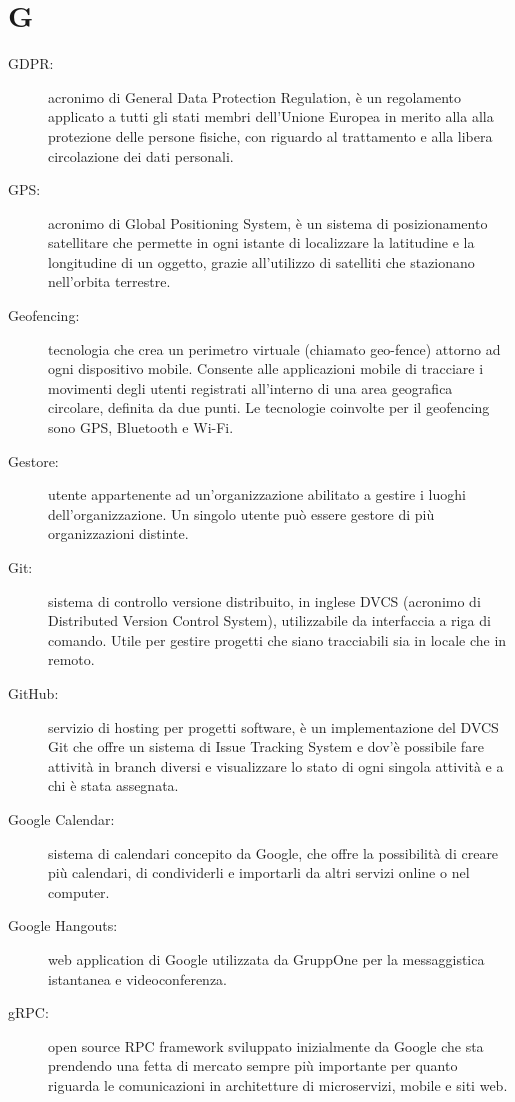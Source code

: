\documentclass{article}
\begin{document}
	\section{G}
	\begin{description}
		\item[GDPR:] acronimo di General Data Protection Regulation, è un regolamento applicato a tutti gli stati membri dell'Unione Europea in merito alla alla protezione delle persone fisiche, con riguardo al trattamento e alla libera circolazione dei dati personali.
		\item[GPS:] acronimo di Global Positioning System, è un sistema di posizionamento satellitare che permette in ogni istante di localizzare la latitudine e la longitudine di un oggetto, grazie all'utilizzo di satelliti che stazionano nell'orbita terrestre.
		\item[Geofencing:] tecnologia che crea un perimetro virtuale (chiamato geo-fence) attorno ad ogni dispositivo mobile. Consente alle applicazioni mobile di tracciare i movimenti degli utenti registrati all’interno di una area geografica circolare, definita da due punti. Le tecnologie coinvolte per il geofencing sono GPS, Bluetooth e Wi-Fi.
		\item[Gestore:] utente appartenente ad un'organizzazione abilitato a gestire i luoghi dell'organizzazione. Un singolo utente può essere gestore di più organizzazioni distinte.
		\item[Git:] sistema di controllo versione distribuito, in inglese DVCS (acronimo di Distributed Version Control System), utilizzabile da interfaccia a riga di comando. Utile per gestire progetti che siano tracciabili sia in locale che in remoto.
		\item[GitHub:] servizio di hosting per progetti software, è un implementazione del DVCS Git che offre un sistema di Issue Tracking System e dov'è possibile fare attività in branch diversi e visualizzare lo stato di ogni singola attività e a chi è stata assegnata.
		\item[Google Calendar:] sistema di calendari concepito da Google, che offre la possibilità di creare più calendari, di condividerli e importarli da altri servizi online o nel computer.
		\item[Google Hangouts:] web application di Google utilizzata da GruppOne per la messaggistica istantanea e videoconferenza.
		\item[gRPC:] open source RPC framework sviluppato inizialmente da Google che sta prendendo una fetta di mercato sempre più importante per quanto riguarda le comunicazioni in architetture di microservizi, mobile e siti web.
	\end{description}
	\newpage
\end{document}
